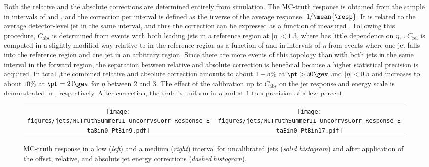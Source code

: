 Both the relative and the absolute corrections are determined entirely from simulation.
The MC-truth response \resp is obtained from the \pythia sample in intervals of \ptgen and \etagen, and the correction per interval is defined as the inverse of the average response, \mbox{$1/\mean{\resp}$}.
It is related to the average detector-level jet \pt in the same interval, and thus the correction can be expressed as a function of measured \pt.
Following this procedure, $C_{\text{abs}}$ is determined from events with both leading jets in a reference region at \mbox{$|\eta| < 1.3$}, where \mean{\resp} has little dependence on $\eta$, \cf {}.
$C_{\text{rel}}$ is computed in a slightly modified way relative to \mean{\resp} in the reference region as a function of \pt and in intervals of $\eta$ from events where one jet falls into the reference region and one jet in an arbitrary region.
Since there are more events of this topology than with both jets in the same interval in the forward region, the separation between relative and absolute correction is beneficial because a higher statistical precision is acquired.
In total ,the combined relative and absolute correction amounts to about $1-5\%$ at \mbox{$\pt > 50\gev$} and \mbox{$|\eta| < 0.5$} and increases to about $10\%$ at \mbox{$\pt = 20\gev$} for $\eta$ between 2 and 3.
The effect of the calibration up to $C_{\text{abs}}$ on the jet response and energy scale is demonstrated in , respectively.
After correction, the scale is uniform in $\eta$ and at $1$ to a precision of a few percent.
\begin{figure}[!ht]
  \centering
  \begin{tabular}{cc}
    \texttt{[image: figures/jets/MCTruthSummer11\_UncorrVsCorr\_Response\_EtaBin0\_PtBin9.pdf]} &
    \texttt{[image: figures/jets/MCTruthSummer11\_UncorrVsCorr\_Response\_EtaBin0\_PtBin17.pdf]} \\
  \end{tabular}
  \caption{MC-truth response in a low (\textit{left}) and a medium (\textit{right}) \ptgen interval for uncalibrated jets (\textit{solid histogram}) and after application of the offset, relative, and absolute jet energy corrections (\textit{dashed histogram}).}
\label{fig:Jets:JEC:CorrectedResponseDistribution}
\end{figure}

